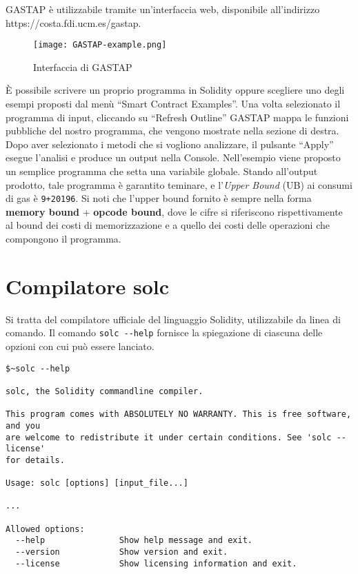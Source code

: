     GASTAP è utilizzabile tramite un'interfaccia web, disponibile all'indirizzo \\
    https://costa.fdi.ucm.es/gastap.
    
    \begin{figure}[h]
        \centering
        \texttt{[image: GASTAP-example.png]}
        \caption{Interfaccia di GASTAP}
        \label{fig:gstp-example}
    \end{figure}
    
    \`E possibile scrivere un proprio programma in Solidity oppure scegliere uno degli esempi proposti dal menù ``Smart Contract Examples''.\newline
    \indent Una volta selezionato il programma di input, cliccando su ``Refresh Outline'' GASTAP mappa le funzioni pubbliche del nostro programma, che vengono mostrate nella sezione di destra. Dopo aver selezionato i metodi che si vogliono analizzare, il pulsante ``Apply'' esegue l'analisi e produce un output nella Console.\newline
    \indent Nell'esempio viene proposto un semplice programma che setta una variabile globale. Stando all'output prodotto, tale programma è garantito teminare, e l'\textit{Upper Bound} (UB) ai consumi di gas è \verb|9+20196|. Si noti che l'upper bound fornito è sempre nella forma \textbf{memory bound} + \textbf{opcode bound}, dove le cifre si riferiscono rispettivamente al bound dei costi di memorizzazione e a quello dei costi delle operazioni che compongono il programma.\newline

    

    
\section{Compilatore solc}

Si tratta del compilatore ufficiale del linguaggio Solidity, utilizzabile da linea di comando.\newline
\indent Il comando \verb|solc --help| fornisce la spiegazione di ciascuna delle opzioni con cui può essere lanciato.


\begin{lstlisting}
$~solc --help

solc, the Solidity commandline compiler.

This program comes with ABSOLUTELY NO WARRANTY. This is free software, and you
are welcome to redistribute it under certain conditions. See 'solc --license'
for details.

Usage: solc [options] [input_file...]

...

Allowed options:
  --help               Show help message and exit.
  --version            Show version and exit.
  --license            Show licensing information and exit.
    
\end{lstlisting}    
    
